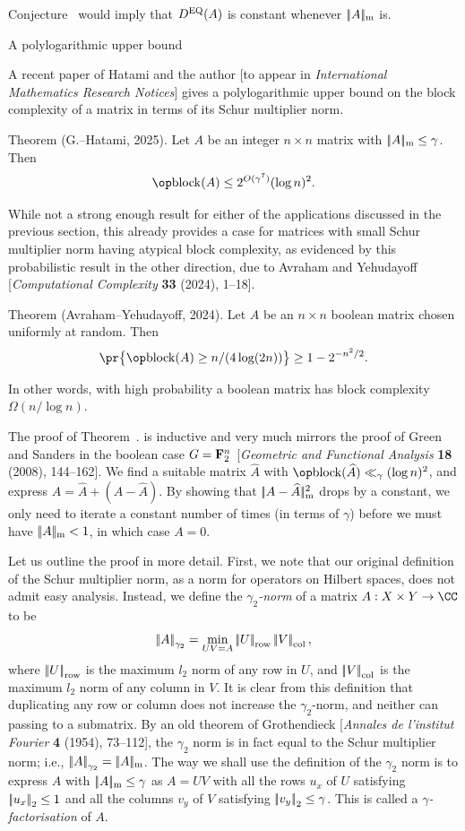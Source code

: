 Conjecture~{\conjHHH} would imply that $D^{\rm EQ}(A)$ is constant whenever $|\!|A|\!|_{\rm m}$ is.

\advsect A polylogarithmic upper bound

A recent paper of Hatami and the author [to appear in {\sl International Mathematics Research Notices}]
gives a polylogarithmic upper bound on the block complexity
of a matrix in terms of its Schur multiplier norm.

\edef\thmGH{\the\sectcount.\the\thmcount}
\parenproclaim Theorem {\advthm} (G.--Hatami, {\rm 2025}).
Let $A$ be an integer $n\times n$ matrix with $|\!|A|\!|_{\rm m}\le \gamma$. Then
$$\block(A) \le 2^{O(\gamma^7)}( \log n)^2.$$

While not a strong enough result for either of the applications discussed in the previous section,
this already provides a case for matrices with small Schur multiplier norm having atypical block
complexity, as evidenced by this
probabilistic result in the other direction, due to Avraham and Yehudayoff [{\sl Computational Complexity}
{\bf 33} (2024), 1--18].

\parenproclaim Theorem {\advthm} (Avraham--Yehudayoff, {\rm 2024}).
Let $A$ be an $n\times n$ boolean matrix chosen uniformly at random. Then
$$\pr\bigl\{ \block(A) \ge n/(4 \log (2n))\bigr\} \ge 1-2^{-n^2/2}.$$

In other words, with high probability a boolean matrix has block complexity $\Omega(n/\log n)$.

The proof of Theorem~{\thmGH} is inductive and very much mirrors the proof of Green and Sanders
in the boolean case $G={\bf F}_2^n$ [{\sl Geometric and Functional Analysis} {\bf 18} (2008), 144--162].
We find a suitable matrix $\hat A$ with $\block(\hat A) \ll_\gamma (\log n)^2$, and express
$A = \hat A+ (A-\hat A)$. By showing that $|\!|A-\widehat A|\!|_{\rm m}^2$ drops by a constant, we only need to
iterate a constant number of times (in terms of $\gamma$)
before we must have $|\!|A|\!|_{\rm m} <1$, in which case $A = 0$.

Let us outline the proof in more detail. First, we note
that our original definition of the Schur multiplier norm, as a norm for operators
on Hilbert spaces, does not admit easy analysis. Instead,
we define the {\it $\gamma_2$-norm} of a matrix $A:X\times Y\to \CC$ to be
$$\left|\!\left|A\right|\!\right|_{\gamma_2} = \min_{UV=A} \left|\!\left|U\right|\!\right|_{\rm row}\left|\!\left|V\right|\!\right|_{\rm col},$$
where $\left|\!\left|U\right|\!\right|_{\rm row}$ is the maximum $l_2$ norm of any row in $U$, and $\left|\!\left|V\right|\!\right|_{\rm col}$ is the maximum
$l_2$ norm of any column in $V$. It is clear from this definition that duplicating any row or column
does not increase the $\gamma_2$-norm, and neither can passing to a submatrix.
By an old theorem of Grothendieck [{\sl Annales de l’institut Fourier} {\bf 4} (1954), 73--112],
the $\gamma_2$ norm is in fact equal to the Schur multiplier norm; i.e., $\left|\!\left|A\right|\!\right|_{\gamma_2} = |\!|A|\!|_{\rm m}$.
The way we shall use the definition of the $\gamma_2$ norm is to express $A$ with $|\!|A|\!|_{\rm m}\le \gamma$
as $A = UV$ with all the rows $u_x$ of $U$ satisfying $\left|\!\left|u_x\right|\!\right|_2\le 1$ and all the columns
$v_y$ of $V$ satisfying $\left|\!\left|v_y\right|\!\right|_2\le \gamma$. This is called a {\it $\gamma$-factorisation}
of $A$.


